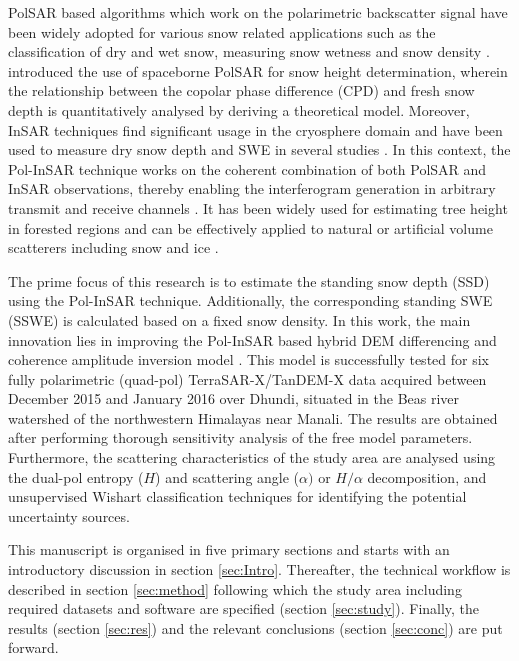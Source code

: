 \documentclass[12pt]{elsarticle}
\numberwithin{equation}{section}
\numberwithin{figure}{section}
\numberwithin{table}{section}
\begin{document}
PolSAR based algorithms which work on the polarimetric backscatter signal have been widely adopted for various snow related applications such as the classification of dry and wet snow, measuring snow wetness and snow density \citep{Singh2017, Snehmani2010, Thakur2012, Thakur2017, Usami2016}.  \cite{Leinss2014} introduced the use of spaceborne PolSAR for snow height determination, wherein the relationship between the copolar phase difference (CPD) and fresh snow depth is quantitatively analysed by deriving a theoretical model. Moreover, InSAR techniques find significant usage in the cryosphere domain and have been used to measure dry snow depth and SWE in several studies \citep{Conde2018, Guneriussen2001, Leinss2015, Li2017, Liu2017}. In this context, the Pol-InSAR technique works on the coherent combination of both PolSAR and InSAR observations, thereby enabling the interferogram generation in arbitrary transmit and receive channels \citep{Papathanassiou2001, Cloude2005, Cloude2010}. It has been widely used for estimating tree height in forested regions and can be effectively applied to natural or artificial volume scatterers including snow and ice \citep{Leinss2014, Hajnsek2009, Kugler2015, Kumar2017, Papathanassiou2001}.

The prime focus of this research is to estimate the standing snow depth (SSD) using the Pol-InSAR technique. Additionally, the corresponding standing SWE (SSWE) is calculated based on a fixed snow density. In this work, the main innovation lies in improving the Pol-InSAR based hybrid DEM differencing and coherence amplitude inversion model \citep{Cloude2005, Cloude2010, Majumdar2019a}. This model is successfully tested for six fully polarimetric (quad-pol) TerraSAR-X/TanDEM-X \citep{Balss2012} data acquired between December 2015 and January 2016 over Dhundi, situated in the Beas river watershed of the northwestern Himalayas near Manali. The results are obtained after performing thorough sensitivity analysis of the free model parameters. Furthermore, the scattering characteristics of the study area are analysed using the dual-pol entropy ($H$) and scattering angle ($\alpha)$ or $H/{\alpha}$ decomposition, and unsupervised Wishart classification techniques \citep{Lee2009, Cloude2010, Singh2014} for identifying the potential uncertainty sources.

This manuscript is organised in five primary sections and starts with an introductory discussion in section \ref{sec:Intro}. Thereafter, the technical workflow is described in section \ref{sec:method} following which the study area including required datasets and software are specified (section \ref{sec:study}). Finally, the results (section \ref{sec:res}) and the relevant conclusions (section \ref{sec:conc}) are put forward.
\end{document}
